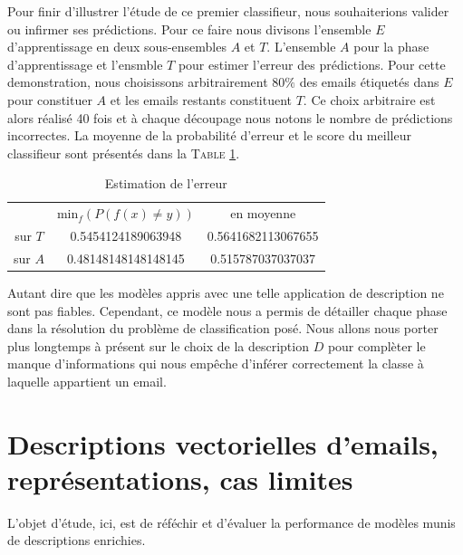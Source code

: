 \documentclass[a4paper, french]{article}
\begin{document}
Pour finir d'illustrer l'\'etude de ce premier classifieur, nous souhaiterions
valider ou infirmer ses pr\'edictions. Pour ce faire nous divisons
l'ensemble $E$ d'apprentissage en deux sous-ensembles $A$ et $T$. 
L'ensemble $A$ pour la phase d'apprentissage et l'ensmble $T$ pour 
estimer l'erreur des pr\'edictions. Pour cette demonstration, 
nous choisissons arbitrairement $80\%$ des emails \'etiquet\'es dans $E$ 
pour constituer $A$ et les emails restants constituent $T$. Ce choix arbitraire
est alors r\'ealis\'e 40 fois et \`a chaque d\'ecoupage nous notons le nombre
de pr\'edictions incorrectes. La moyenne de la probabilit\'e d'erreur et
le score du meilleur classifieur sont pr\'esent\'es dans la T\textsc{able}
\ref{tbl:erreur_exo2}.

\begin{table}[h]
\begin{center}
    \caption{Estimation de l'erreur}
    \label{tbl:erreur_exo2}
    \vskip 4mm
    \begin{tabular}{ccc}
        &min$_f(P(f(x)\neq y))$&en moyenne\\
        sur $T$&0.5454124189063948&0.5641682113067655\\
        sur $A$&0.48148148148148145&0.515787037037037
    \end{tabular}
\end{center}
\end{table}

Autant dire que les mod\`eles appris avec une telle application de description
ne sont pas fiables. Cependant, ce mod\`ele nous a permis de d\'etailler chaque
phase dans la r\'esolution du probl\`eme de classification pos\'e. Nous allons
nous porter plus longtemps \`a pr\'esent sur le choix de la description $D$
pour compl\`eter le manque d'informations qui nous emp\^eche 
d'inf\'erer correctement la classe \`a laquelle appartient un email.


\section{Descriptions vectorielles d'emails, repr\'esentations, cas limites}

L'objet d'\'etude, ici, est de r\'ef\'echir et d'\'evaluer la performance 
de mod\`eles munis de descriptions enrichies.
\end{document}
